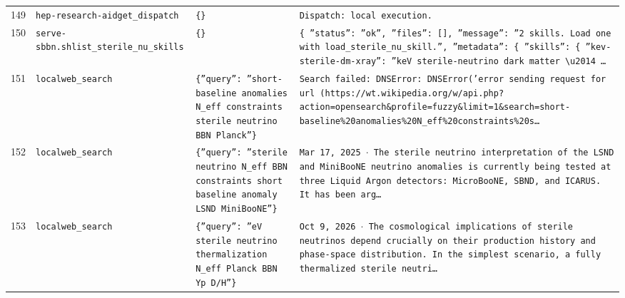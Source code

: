 \documentclass[11pt,a4paper]{article}
\begin{document}
\begin{longtable}{@{}p{}p{}p{}p{}@{}}
149 & \texttt{hep-research-aid}\newline\texttt{get\_\allowbreak{}dispatch} & \texttt{\{\}\allowbreak{}} & \texttt{Dispatch:\allowbreak{} local execution.} \\
150 & \texttt{serve-sbbn.sh}\newline\texttt{list\_\allowbreak{}sterile\_\allowbreak{}nu\_\allowbreak{}skills} & \texttt{\{\}\allowbreak{}} & \texttt{\{   ''status'':\allowbreak{} ''ok'',\allowbreak{}   ''files'':\allowbreak{} []\allowbreak{},\allowbreak{}   ''message'':\allowbreak{} ''2 skills. Load one with load\_\allowbreak{}sterile\_\allowbreak{}nu\_\allowbreak{}skill.'',\allowbreak{}   ''metadata'':\allowbreak{} \{     ''skills'':\allowbreak{} \{       ''kev-sterile-dm-xray'':\allowbreak{} ''keV sterile-neutrino dark matter \textbackslash{}\allowbreak{}u2014 \ldots{}\allowbreak{}} \\
151 & \texttt{local}\newline\texttt{web\_\allowbreak{}search} & \texttt{\{''query'':\allowbreak{} ''short-baseline anomalies N\_\allowbreak{}eff constraints sterile neutrino BBN Planck''\}\allowbreak{}} & \texttt{Search failed:\allowbreak{} DNSError:\allowbreak{} DNSError('error sending request for url (https:\allowbreak{}/\allowbreak{}/\allowbreak{}wt.wikipedia.org/\allowbreak{}w/\allowbreak{}api.php?action=\allowbreak{}opensearch\&profile=\allowbreak{}fuzzy\&limit=\allowbreak{}1\&search=\allowbreak{}short-baseline\%20anomalies\%20N\_\allowbreak{}eff\%20constraints\%20s\ldots{}\allowbreak{}} \\
152 & \texttt{local}\newline\texttt{web\_\allowbreak{}search} & \texttt{\{''query'':\allowbreak{} ''sterile neutrino N\_\allowbreak{}eff BBN constraints short baseline anomaly LSND MiniBooNE''\}\allowbreak{}} & \texttt{Mar 17,\allowbreak{} 2025 $\cdot$ The sterile neutrino interpretation of the LSND and MiniBooNE neutrino anomalies is currently being tested at three Liquid Argon detectors:\allowbreak{} MicroBooNE,\allowbreak{} SBND,\allowbreak{} and ICARUS. It has been arg\ldots{}\allowbreak{}} \\
153 & \texttt{local}\newline\texttt{web\_\allowbreak{}search} & \texttt{\{''query'':\allowbreak{} ''eV sterile neutrino thermalization N\_\allowbreak{}eff Planck BBN Yp D/\allowbreak{}H''\}\allowbreak{}} & \texttt{Oct 9,\allowbreak{} 2026 $\cdot$ The cosmological implications of sterile neutrinos depend crucially on their production history and phase-space distribution. In the simplest scenario,\allowbreak{} a fully thermalized sterile neutri\ldots{}\allowbreak{}} \\

\end{longtable}
\end{document}
